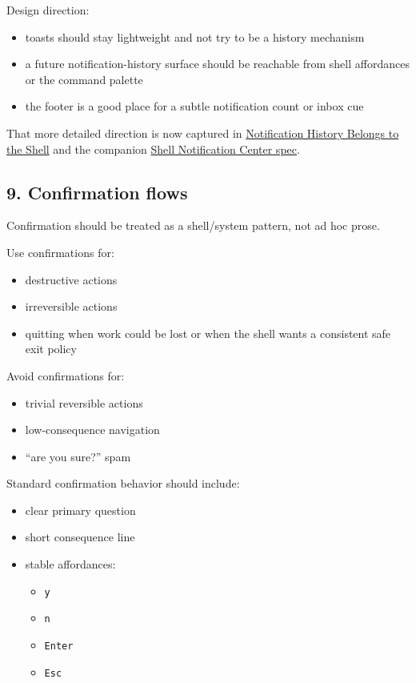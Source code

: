 Design direction:

\begin{itemize}
\tightlist
\item
  toasts should stay lightweight and not try to be a history mechanism
\item
  a future notification-history surface should be reachable from shell affordances or the command palette
\item
  the footer is a good place for a subtle notification count or inbox cue
\end{itemize}

That more detailed direction is now captured in \href{https://github.com/flyingrobots/bijou/blob/cbd70612140e7a450d764b3c7be1c6af878b99bc/docs/strategy/notification-history-belongs-to-the-shell.md}{Notification History Belongs to the Shell} and the companion \href{https://github.com/flyingrobots/bijou/blob/cbd70612140e7a450d764b3c7be1c6af878b99bc/docs/specs/shell-notification-center.spec.json}{Shell Notification Center spec}.

\subsection{9. Confirmation flows}\label{record-047-confirmation-flows}

Confirmation should be treated as a shell/system pattern, not ad hoc prose.

Use confirmations for:

\begin{itemize}
\tightlist
\item
  destructive actions
\item
  irreversible actions
\item
  quitting when work could be lost or when the shell wants a consistent safe exit policy
\end{itemize}

Avoid confirmations for:

\begin{itemize}
\tightlist
\item
  trivial reversible actions
\item
  low-consequence navigation
\item
  ``are you sure?'' spam
\end{itemize}

Standard confirmation behavior should include:

\begin{itemize}
\tightlist
\item
  clear primary question
\item
  short consequence line
\item
  stable affordances:

  \begin{itemize}
  \tightlist
  \item
    \texttt{y}
  \item
    \texttt{n}
  \item
    \texttt{E\allowbreak{}n\allowbreak{}t\allowbreak{}e\allowbreak{}r}
  \item
    \texttt{E\allowbreak{}s\allowbreak{}c}
  \end{itemize}
\end{itemize}

